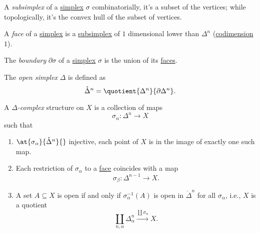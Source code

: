 \begin{definition}[Subsimplex]\label{def:subsimplex}
	A \emph{subsimplex} of a \hyperref[def:standard-simplex]{simplex} \(\sigma \) combinatorially, it's a
	subset of the vertices; while topologically, it's the convex hull of the subset of vertices.
	\begin{figure}[H]
		\centering
		\label{fig:def:subsimplex}
	\end{figure}
\end{definition}

\begin{definition}[Face]\label{def:face}
	A \emph{face} of a \hyperref[def:standard-simplex]{simplex} is a \hyperref[def:subsimplex]{subsimplex} of \(1\) dimensional lower
	than \(\Delta ^n\) (\underline{codimension \(1\)}).
\end{definition}

\begin{definition}[Boundary]\label{def:boundary}
	The \emph{boundary} \(\partial \sigma \) of a \hyperref[def:standard-simplex]{simplex} \(\sigma \) is the union of its \hyperref[def:face]{faces}.
\end{definition}

\begin{definition}\label{def:open-simplex}
	The \emph{open simplex} \(\Delta \) is defined as
	\[
		\mathring{\Delta}^n = \quotient{\Delta^n }{\partial \Delta^n }.
	\]
\end{definition}

\begin{definition}\label{def:delta-complex}
	A \emph{\(\Delta \)-complex} structure on \(X\) is a collection of maps
	\[
		\sigma _\alpha \colon \Delta ^n\to X
	\]
	such that
	\begin{enumerate}
		\item \(\at{\sigma _\alpha }{\mathring{\Delta}^n}{}\) injective, each point of \(X\) is in the image of exactly one such map.
		\item Each restriction of \(\sigma _\alpha \) to a \hyperref[def:face]{face} coincides with a map
		      \[
			      \sigma _\beta \colon \Delta^{n-1} \to X.
		      \]
		\item A set \(A\subseteq X\) is open if and only if \(\sigma ^{-1} _\alpha (A)\) is open in \(\mathring{\Delta }^n\) for all
		      \(\sigma _\alpha \), i.e., \(X\) is a quotient
		      \[
			      \coprod\limits_{n, \alpha }\Delta ^n_\alpha \overset{\coprod \sigma _\alpha}{\to} X.
		      \]
	\end{enumerate}
\end{definition}

